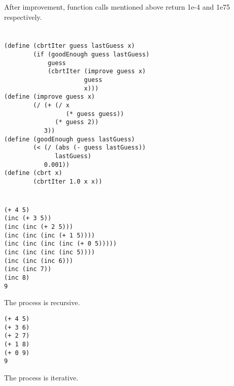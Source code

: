 \documentclass[a4paper]{report}
\begin{document}
After improvement, function calls mentioned above return 1e-4 and 1e75 respectively.


\section{}

\begin{lstlisting}
(define (cbrtIter guess lastGuess x)
        (if (goodEnough guess lastGuess)
            guess
            (cbrtIter (improve guess x)
                      guess
                      x)))
(define (improve guess x)
        (/ (+ (/ x
                 (* guess guess))
              (* guess 2))
           3))
(define (goodEnough guess lastGuess)
        (< (/ (abs (- guess lastGuess))
              lastGuess)
           0.001))
(define (cbrt x)
        (cbrtIter 1.0 x x))
\end{lstlisting}


\section{}

\begin{lstlisting}
(+ 4 5)
(inc (+ 3 5))
(inc (inc (+ 2 5)))
(inc (inc (inc (+ 1 5))))
(inc (inc (inc (inc (+ 0 5)))))
(inc (inc (inc (inc 5))))
(inc (inc (inc 6)))
(inc (inc 7))
(inc 8)
9
\end{lstlisting}

The process is recursive.

\begin{lstlisting}
(+ 4 5)
(+ 3 6)
(+ 2 7)
(+ 1 8)
(+ 0 9)
9
\end{lstlisting}

The process is iterative.
\end{document}
